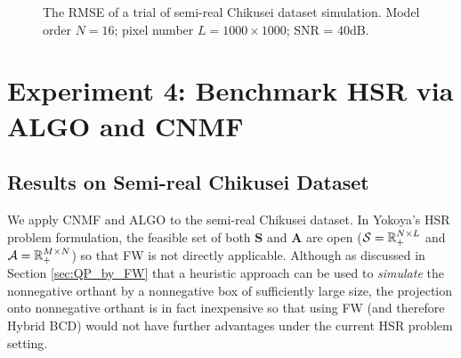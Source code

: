 \begin{figure}
{
    }
	\caption{The RMSE of a trial of semi-real Chikusei dataset simulation.
             Model order $N = 16$; pixel number $L = 1000 \times 1000$; SNR =
             $40$dB.}
    \label{fig:results_wfFUMI_chikusei_RMSE}
\end{figure}

\newpage
\section{Experiment 4: Benchmark HSR via ALGO and CNMF}
\subsection{Results on Semi-real Chikusei Dataset}

We apply CNMF and ALGO to the semi-real Chikusei dataset.
In Yokoya's HSR problem formulation, the feasible set of both $\bm S$ and
$\bm A$ are open ($\mathcal S = \mathbb R_+^{N \times L}$ and
$\mathcal A = \mathbb R_+^{M \times N}$) so that FW is not directly applicable.
Although as discussed in Section \ref{sec:QP_by_FW} that a heuristic approach
can be used to \textit{simulate} the nonnegative orthant by a nonnegative box
of sufficiently large size, the projection onto nonnegative orthant is in fact
inexpensive so that using FW (and therefore Hybrid BCD) would not have further
advantages under the current HSR problem setting.

